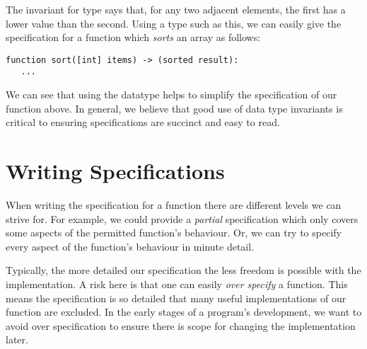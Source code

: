 The invariant for type  says that, for any two adjacent elements, the first has a lower value than the second.  Using a type such as this, we can easily give the specification for a function which {\em sorts} an array as follows:

\begin{tcolorbox}\begin{lstlisting}[language=Whiley]
function sort([int] items) -> (sorted result):
   ...
\end{lstlisting}\end{tcolorbox}

We can see that using the  datatype helps to simplify the specification of our  function above.  In general, we believe that good use of data type invariants is critical to ensuring specifications are succinct and easy to read.

\section{Writing Specifications}

When writing the specification for a function there are different levels we can strive for.  For example, we could provide a {\em partial} specification which only covers some aspects of the permitted function's behaviour.  Or, we can try to specify every aspect of the function's behaviour in minute detail.  

Typically, the more detailed our specification the less freedom is possible with the implementation.  A risk here is that one can easily {\em over specify} a function.  This means the specification is so detailed that many useful implementations of our function are excluded.  In the early stages of a program's development, we want to avoid over specification to ensure there is scope for changing the implementation later.  




